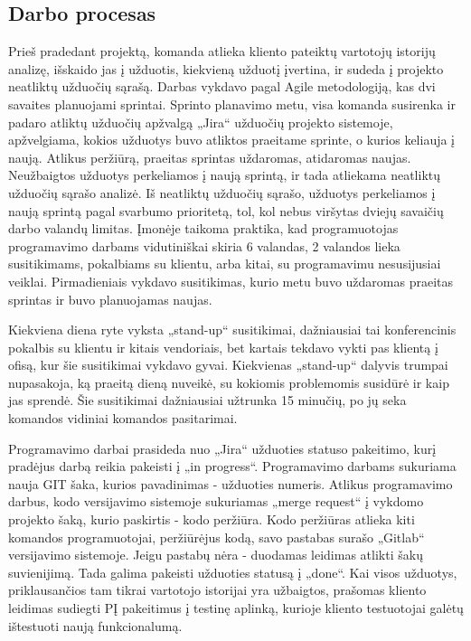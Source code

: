 \subsection{Darbo procesas}
Prieš pradedant projektą, komanda atlieka kliento pateiktų vartotojų istorijų analizę, išskaido jas į užduotis, kiekvieną užduotį įvertina, ir sudeda į projekto neatliktų užduočių sąrašą.
Darbas vykdavo pagal Agile metodologiją, kas dvi savaites planuojami sprintai. Sprinto planavimo metu, visa komanda susirenka ir padaro atliktų užduočių apžvalgą „Jira“
užduočių projekto sistemoje, apžvelgiama, kokios užduotys buvo atliktos praeitame sprinte, o kurios keliauja į naują.
Atlikus peržiūrą, praeitas sprintas uždaromas, atidaromas naujas. Neužbaigtos užduotys perkeliamos į naują sprintą, ir tada atliekama neatliktų užduočių sąrašo analizė.
Iš neatliktų užduočių sąrašo, užduotys perkeliamos į naują sprintą pagal svarbumo prioritetą, tol, kol nebus viršytas dviejų savaičių darbo valandų limitas. Įmonėje taikoma praktika,
kad programuotojas programavimo darbams vidutiniškai skiria 6 valandas, 2 valandos lieka susitikimams, pokalbiams su klientu, arba kitai, su programavimu nesusijusiai veiklai.
Pirmadieniais vykdavo susitikimas, kurio metu buvo uždaromas praeitas sprintas ir buvo planuojamas naujas.

Kiekviena diena ryte vyksta „stand-up“ susitikimai, dažniausiai tai konferencinis pokalbis su klientu ir kitais vendoriais, bet kartais tekdavo vykti pas klientą į ofisą, kur šie
susitikimai vykdavo gyvai. Kiekvienas „stand-up“ dalyvis trumpai nupasakoja, ką praeitą dieną nuveikė, su kokiomis problemomis susidūrė ir kaip jas sprendė.
Šie susitikimai dažniausiai užtrunka 15 minučių, po jų seka komandos vidiniai komandos pasitarimai.

Programavimo darbai prasideda nuo „Jira“ užduoties statuso pakeitimo, kurį pradėjus darbą reikia pakeisti į „in progress“. Programavimo darbams sukuriama nauja GIT šaka, kurios pavadinimas
- užduoties numeris. Atlikus programavimo darbus, kodo versijavimo sistemoje
sukuriamas „merge request“ į vykdomo projekto šaką, kurio paskirtis - kodo peržiūra. Kodo peržiūras atlieka kiti komandos programuotojai, peržiūrėjus kodą, savo pastabas surašo
„Gitlab“ versijavimo sistemoje. Jeigu pastabų nėra - duodamas leidimas atlikti šakų suvienijimą. Tada galima pakeisti užduoties statusą į „done“.
Kai visos užduotys, priklausančios tam tikrai vartotojo istorijai yra užbaigtos,
prašomas kliento leidimas sudiegti PĮ pakeitimus į testinę aplinką, kurioje kliento testuotojai galėtų ištestuoti naują funkcionalumą.

